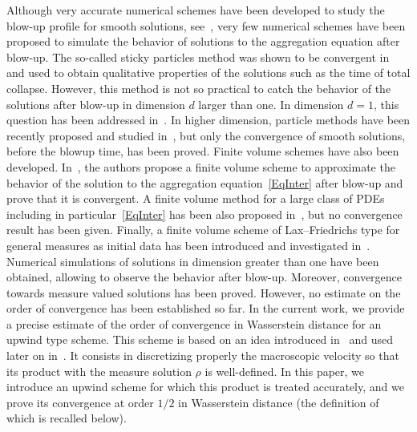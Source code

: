 Although very accurate numerical schemes have been developed to study the blow-up profile for smooth solutions, see~\cite{Huang2,Huang1}, very few numerical schemes have been proposed to simulate the behavior of solutions to the aggregation equation after blow-up. The so-called sticky particles method was shown to be convergent in~\cite{Carrillo} and used to obtain qualitative properties of the solutions such as the time of total collapse. However, this method is not so practical to catch the behavior of the solutions after blow-up in dimension $d$ larger than one. In dimension $d=1$, this question has been addressed in~\cite{NoDEA}. In higher dimension, particle methods have been recently proposed and studied in~\cite{CB,Freda}, but only the convergence of smooth solutions, before the blowup time, has been proved. Finite volume schemes have also been developed. In~\cite{sinum}, the authors propose a finite volume scheme to approximate the behavior of the solution to the aggregation equation~\eqref{EqInter} after blow-up and prove that it is convergent. A finite volume method for a large class of PDEs including in particular~\eqref{EqInter} has been also proposed in~\cite{CCH}, but no convergence result has been given. Finally, a finite volume scheme of Lax--Friedrichs type for general measures as initial data has been introduced and investigated in~\cite{CJLV}. Numerical simulations of solutions in dimension greater than one have been obtained, allowing to observe the behavior after blow-up. Moreover, convergence towards measure valued solutions has been proved. However, no estimate on the order of convergence has been established so far. In the current work, we provide a precise estimate of the order of convergence in Wasserstein distance for an upwind type scheme. This scheme is based on an idea introduced in~\cite{NoDEA} and used later on in~\cite{CJLV,sinum}. It consists in discretizing properly the macroscopic velocity so that its product with the measure solution $\rho$ is well-defined. In this paper, we introduce an upwind scheme for which this product is treated accurately, and we prove its convergence at order $1/2$ in Wasserstein distance (the definition of which is recalled below).

